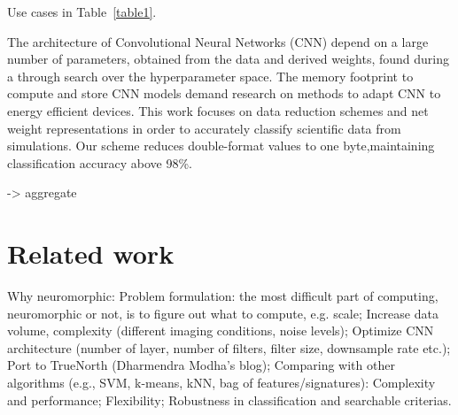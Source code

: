 Use cases in Table~\ref{table1}.

The architecture of Convolutional Neural Networks (CNN) depend on a
large number of parameters, obtained from the data and derived weights,
found during a through search over the hyperparameter space. The
memory footprint to compute and store CNN models demand research
on methods to adapt CNN to energy efficient devices. This work focuses
on data reduction schemes and net weight representations in order to
accurately classify scientific data from simulations. Our scheme reduces
double-format values to one byte,maintaining classification accuracy
above 98\%.

-> aggregate



\section{Related work}
Why neuromorphic:
Problem formulation: the most difficult part of computing, neuromorphic or not, is to figure out what to compute, e.g. scale;
Increase data volume, complexity (different imaging conditions, noise levels);
Optimize CNN architecture (number of layer, number of filters, filter size, downsample rate etc.);
Port to TrueNorth (Dharmendra Modha’s blog);
Comparing with other algorithms (e.g., SVM, k-means, kNN, bag of features/signatures):
Complexity and performance;
Flexibility;
Robustness in classification and searchable criterias.
